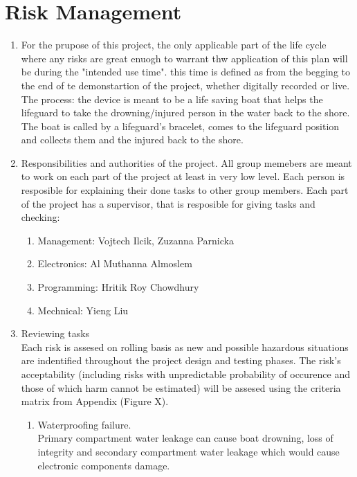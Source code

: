 \documentclass{article}[10pt]
\begin{document}
\section{Risk Management}
\begin{enumerate}
    \item For the prupose of this project, the only applicable part of the life cycle where any risks are great enuogh to warrant thw application 
    of this plan will be during the "intended use time". this time is defined as from the begging to the end of te demonstartion of the project, 
    whether digitally recorded or live. \\
    The process: the device is meant to be a life saving boat that helps the lifeguard to take the drowning/injured person in the water back to the shore.
    The boat is called by a lifeguard's bracelet, comes to the lifeguard position and collects them and the injured back to the shore. 
    \item Responsibilities and authorities of the project.
    All group memebers are meant to work on each part of the project at least in very low level. Each person is resposible for explaining
    their done tasks to other group members. Each part of the project has a supervisor, that is resposible for giving tasks and checking:
    \begin{enumerate}
        \item Management: Vojtech Ilcik, Zuzanna Parnicka
        \item Electronics: Al Muthanna Almoslem
        \item Programming: Hritik Roy Chowdhury
        \item Mechnical: Yieng Liu
    \end{enumerate}
    \item Reviewing tasks\\
    Each risk is assesed on rolling basis as new and possible hazardous situations are indentified throughout the project design and testing phases.
    The risk's acceptability (including risks with unpredictable probability of occurence and those of which harm cannot be estimated) will be assesed 
    using the criteria matrix from Appendix (Figure X).
    \begin{enumerate}
        \item Waterproofing failure.\\
        Primary compartment water leakage can cause boat drowning, loss of integrity and secondary compartment water leakage which would cause 
        electronic components damage.

\end{enumerate}
\end{enumerate}
\end{document}
